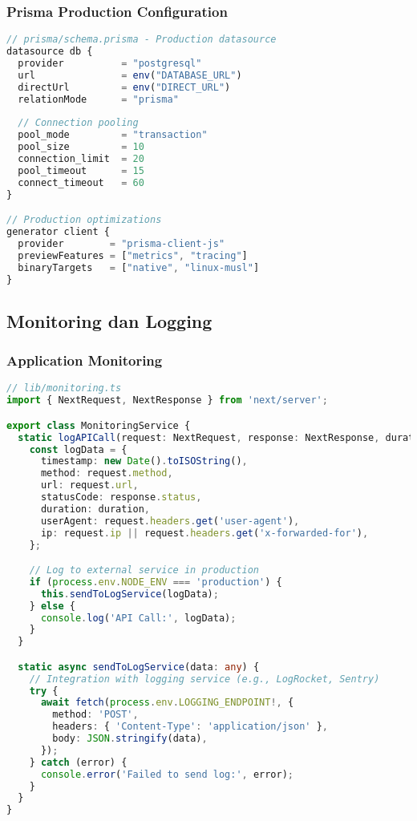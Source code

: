 \subsubsection{Prisma Production Configuration}

\begin{lstlisting}[language=JavaScript, caption=Prisma Production Settings]
// prisma/schema.prisma - Production datasource
datasource db {
  provider          = "postgresql"
  url               = env("DATABASE_URL")
  directUrl         = env("DIRECT_URL")
  relationMode      = "prisma"
  
  // Connection pooling
  pool_mode         = "transaction"
  pool_size         = 10
  connection_limit  = 20
  pool_timeout      = 15
  connect_timeout   = 60
}

// Production optimizations
generator client {
  provider        = "prisma-client-js"
  previewFeatures = ["metrics", "tracing"]
  binaryTargets   = ["native", "linux-musl"]
}
\end{lstlisting}

\subsection{Monitoring dan Logging}

\subsubsection{Application Monitoring}

\begin{lstlisting}[language=TypeScript, caption=Monitoring Configuration]
// lib/monitoring.ts
import { NextRequest, NextResponse } from 'next/server';

export class MonitoringService {
  static logAPICall(request: NextRequest, response: NextResponse, duration: number) {
    const logData = {
      timestamp: new Date().toISOString(),
      method: request.method,
      url: request.url,
      statusCode: response.status,
      duration: duration,
      userAgent: request.headers.get('user-agent'),
      ip: request.ip || request.headers.get('x-forwarded-for'),
    };

    // Log to external service in production
    if (process.env.NODE_ENV === 'production') {
      this.sendToLogService(logData);
    } else {
      console.log('API Call:', logData);
    }
  }

  static async sendToLogService(data: any) {
    // Integration with logging service (e.g., LogRocket, Sentry)
    try {
      await fetch(process.env.LOGGING_ENDPOINT!, {
        method: 'POST',
        headers: { 'Content-Type': 'application/json' },
        body: JSON.stringify(data),
      });
    } catch (error) {
      console.error('Failed to send log:', error);
    }
  }
}
\end{lstlisting}

